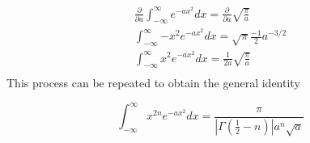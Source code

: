\documentclass[a4paper]{article}
\begin{document}
\begin{gather*}
\frac{\partial}{\partial a} \int_{-\infty}^{\infty}{e^{-ax^2}}dx = \frac{\partial}{\partial a} \sqrt{\frac{\pi}{a}}  \\
\int_{-\infty}^{\infty}{-x^2 e^{-ax^2}}dx = \sqrt{\pi} \frac{-1}{2} a^{-3/2} \\
\boxed{
\int_{-\infty}^{\infty}{x^2 e^{-ax^2}}dx = \frac{1}{2a}  \sqrt{\frac{\pi}{a}}
}\\
\end{gather*}
This process can be repeated to obtain the general identity

\begin{equation}
\boxed{
\int_{-\infty}^{\infty}{x^{2n} e^{-ax^2}}dx = \frac{\pi}{|\Gamma(\tfrac{1}{2} - n)|a^n \sqrt{a}}}
\end{equation}
\end{document}
